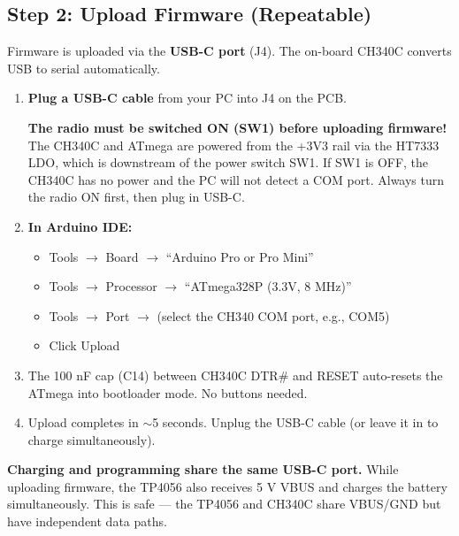 \documentclass[a4paper,11pt]{article}
\renewcommand*{\,}{ }%
\begin{document}
\subsection{Step 2: Upload Firmware (Repeatable)}

Firmware is uploaded via the \textbf{USB-C port} (J4). The on-board CH340C converts USB to serial automatically.

\begin{enumerate}
    \item \textbf{Plug a USB-C cable} from your PC into J4 on the PCB.
    
    \begin{dangerbox}
    \textbf{The radio must be switched ON (SW1) before uploading firmware!} The CH340C and ATmega are powered from the +3V3 rail via the HT7333 LDO, which is downstream of the power switch SW1. If SW1 is OFF, the CH340C has no power and the PC will not detect a COM port. Always turn the radio ON first, then plug in USB-C.
    \end{dangerbox}
    
    \item \textbf{In Arduino IDE:}
    \begin{itemize}[noitemsep]
        \item Tools $\rightarrow$ Board $\rightarrow$ ``Arduino Pro or Pro Mini''
        \item Tools $\rightarrow$ Processor $\rightarrow$ ``ATmega328P (3.3V, 8 MHz)''
        \item Tools $\rightarrow$ Port $\rightarrow$ (select the CH340 COM port, e.g., COM5)
        \item Click Upload
    \end{itemize}
    
    \item The 100\,nF cap (C14) between CH340C DTR\# and RESET auto-resets the ATmega into bootloader mode. No buttons needed.
    
    \item Upload completes in $\sim$5 seconds. Unplug the USB-C cable (or leave it in to charge simultaneously).
\end{enumerate}

\begin{infobox}
\textbf{Charging and programming share the same USB-C port.} While uploading firmware, the TP4056 also receives 5\,V VBUS and charges the battery simultaneously. This is safe --- the TP4056 and CH340C share VBUS/GND but have independent data paths.
\end{infobox}
\end{document}
